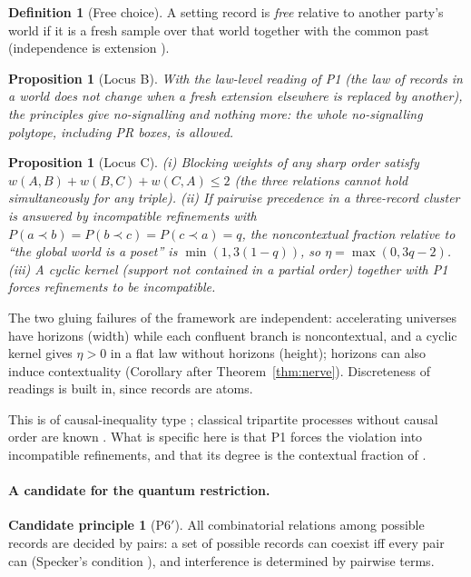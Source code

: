 \documentclass[11pt]{article}
\newtheorem{proposition}[theorem]{Proposition}
\theoremstyle{definition}
\newtheorem{definition}[theorem]{Definition}
\newtheorem{candidate}{Candidate principle}
\theoremstyle{remark}
\begin{document}
\begin{definition}[Free choice]
A setting record is \emph{free} relative to another party's world if it is a fresh sample over that world together with the common past (independence is extension \cite{pzfc}).
\end{definition}

\begin{proposition}[Locus B]
With the law-level reading of P1 (the law of records in a world does not change when a fresh extension elsewhere is replaced by another), the principles give no-signalling and nothing more: the whole no-signalling polytope, including PR boxes, is allowed.
\end{proposition}

\begin{proposition}[Locus C]
(i) Blocking weights of any sharp order satisfy $w(A,B)+w(B,C)+w(C,A)\le2$ (the three relations cannot hold simultaneously for any triple). (ii) If pairwise precedence in a three-record cluster is answered by incompatible refinements with $P(a\prec b)=P(b\prec c)=P(c\prec a)=q$, the noncontextual fraction relative to ``the global world is a poset'' is $\min(1,3(1-q))$, so $\eta=\max(0,3q-2)$. (iii) A cyclic kernel (support not contained in a partial order) together with P1 forces refinements to be incompatible.
\end{proposition}

The two gluing failures of the framework are independent: accelerating universes have horizons (width) while each confluent branch is noncontextual, and a cyclic kernel gives $\eta>0$ in a flat law without horizons (height); horizons can also induce contextuality (Corollary after Theorem~\ref{thm:nerve}). Discreteness of readings is built in, since records are atoms.

This is of causal-inequality type \cite{ocb}; classical tripartite processes without causal order are known \cite{baumelerwolf}. What is specific here is that P1 forces the violation into incompatible refinements, and that its degree is the contextual fraction of \cite{pzfc,abramsky}.

\paragraph{A candidate for the quantum restriction.}
\begin{candidate}[P6$'$]\label{p6} All combinatorial relations among possible records are decided by pairs: a set of possible records can coexist iff every pair can (Specker's condition \cite{specker}), and interference is determined by pairwise terms.\end{candidate}
\end{document}
